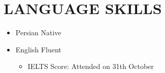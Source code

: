 \documentclass[10pt,a4paper,sans]{moderncv} %
\begin{document}
\begin{comment}
			\begin{itemize}
				\item Elasticsearch
				\begin{itemize}
					\item Business, Analytics
					\item Kibana
				\end{itemize}
				\item Docker
				\item Version Control
				\begin{itemize}
					\item Git
				\end{itemize}
				\item Databases
				\begin{itemize}
					\item MySQL
					\item MongoDB
				\end{itemize}
				\item OS
				\begin{itemize}
					\item Linux
						\begin{itemize}
							\item Ubuntu
							\item Cento OS
						\end{itemize}
					\item MacOS
				\end{itemize}
				\item Testing
				\begin{itemize}
					\item Unit Test
				\end{itemize}
				\item RESTful API
				\item AWS
				\item Design Patterns
			\end{itemize}		
		\end{multicols}
	\end{itemize}
\end{comment}
	\section{LANGUAGE SKILLS}
	
	\begin{itemize}
	\item Persian \hspace{5 pt} Native
	\item English \hspace{6 pt} Fluent   
		\begin{itemize}
			 \item IELTS Score: Attended on 31th October 
		\end{itemize}
	\end{itemize} 
	
\end{document}
